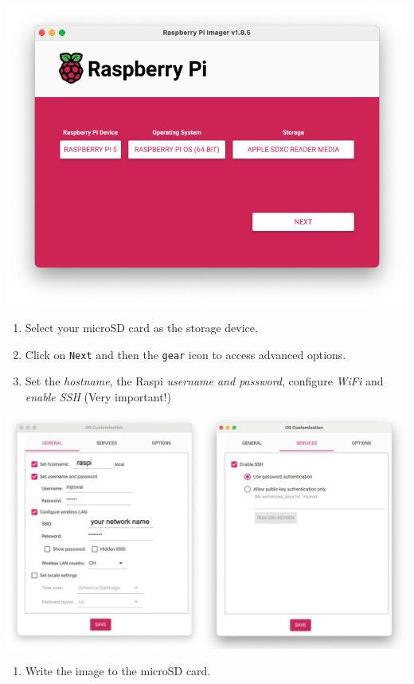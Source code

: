 \documentclass[
]{article}
\providecommand{\tightlist}{%
  \setlength{\itemsep}{0pt}\setlength{\parskip}{0pt}}\usepackage{longtable,booktabs,array}
\begin{document}
\noindent \begin{center}
\includegraphics[width=0.7\linewidth,height=\textheight,keepaspectratio]{images/png/r5-burn.png}
\end{center}

\begin{enumerate}
\def\labelenumi{\arabic{enumi}.}
\setcounter{enumi}{4}
\tightlist
\item
  Select your microSD card as the storage device.
\item
  Click on \texttt{Next} and then the \texttt{gear} icon to access
  advanced options.
\item
  Set the \emph{hostname}, the Raspi \emph{username and password},
  configure \emph{WiFi} and \emph{enable SSH} (Very important!)
\end{enumerate}

\noindent \begin{center}
\includegraphics[width=0.9\linewidth,height=\textheight,keepaspectratio]{images/jpeg/setup.jpg}
\end{center}

\begin{enumerate}
\def\labelenumi{\arabic{enumi}.}
\setcounter{enumi}{7}
\tightlist
\item
  Write the image to the microSD card.
\end{enumerate}
\end{document}
